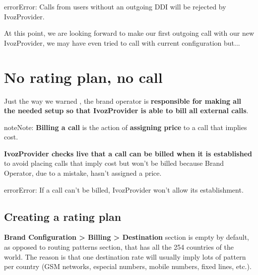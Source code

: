 \documentclass[letterpaper,10pt,english]{sphinxmanual}
\begin{document}
\begin{notice}{error}{Error:}
Calls from users without an outgoing DDI will be rejected by IvozProvider.
\end{notice}

At this point, we are looking forward to make our first outgoing call with our
new IvozProvider, we may have even tried to call with current configuration but...


\section{No rating plan, no call}
\label{getting_started/external_outgoing_calls/noplan_nocall:no-rating-plan-no-call}\label{getting_started/external_outgoing_calls/noplan_nocall:noplan-nocall}\label{getting_started/external_outgoing_calls/noplan_nocall::doc}
Just the way we warned {\hyperref[basic_concepts/operation_roles/index:brand\string-responsibilities]{}}, the brand operator is \textbf{responsible for making all the
needed setup so that IvozProvider is able to bill all external calls}.

\begin{notice}{note}{Note:}
\textbf{Billing a call} is the action of \textbf{assigning price} to a call that implies
cost.
\end{notice}

\textbf{IvozProvider checks live that a call can be billed when it is established} to avoid
placing calls that imply cost but won't be billed because Brand Operator, due to
a mistake, hasn't assigned a price.

\begin{notice}{error}{Error:}
If a call can't be billed, IvozProvider won't allow its establishment.
\end{notice}


\subsection{Creating a rating plan}
\label{getting_started/external_outgoing_calls/noplan_nocall:creating-a-rating-plan}
\textbf{Brand Configuration \textgreater{} Billing \textgreater{} Destination} section is empty by default, as opposed to routing patterns section,
that has all the 254 countries of the world. The reason is that one destination rate
will usually imply lots of pattern per country (GSM networks, especial numbers,
mobile numbers, fixed lines, etc.).
\end{document}

